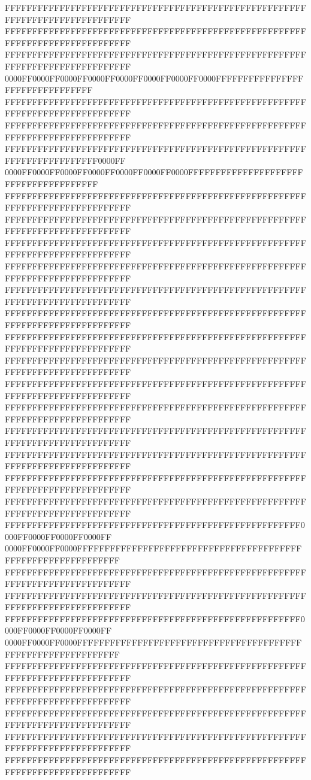 FFFFFFFFFFFFFFFFFFFFFFFFFFFFFFFFFFFFFFFFFFFFFFFFFFFFFFFFFFFFFFFFFFFFFFFFFFFFFF
FFFFFFFFFFFFFFFFFFFFFFFFFFFFFFFFFFFFFFFFFFFFFFFFFFFFFFFFFFFFFFFFFFFFFFFFFFFFFF
FFFFFFFFFFFFFFFFFFFFFFFFFFFFFFFFFFFFFFFFFFFFFFFFFFFFFFFFFFFFFFFFFFFFFFFFFFFFFF
0000FF0000FF0000FF0000FF0000FF0000FF0000FF0000FFFFFFFFFFFFFFFFFFFFFFFFFFFFFFFF
FFFFFFFFFFFFFFFFFFFFFFFFFFFFFFFFFFFFFFFFFFFFFFFFFFFFFFFFFFFFFFFFFFFFFFFFFFFFFF
FFFFFFFFFFFFFFFFFFFFFFFFFFFFFFFFFFFFFFFFFFFFFFFFFFFFFFFFFFFFFFFFFFFFFFFFFFFFFF
FFFFFFFFFFFFFFFFFFFFFFFFFFFFFFFFFFFFFFFFFFFFFFFFFFFFFFFFFFFFFFFFFFFFFFFF0000FF
0000FF0000FF0000FF0000FF0000FF0000FF0000FFFFFFFFFFFFFFFFFFFFFFFFFFFFFFFFFFFFFF
FFFFFFFFFFFFFFFFFFFFFFFFFFFFFFFFFFFFFFFFFFFFFFFFFFFFFFFFFFFFFFFFFFFFFFFFFFFFFF
FFFFFFFFFFFFFFFFFFFFFFFFFFFFFFFFFFFFFFFFFFFFFFFFFFFFFFFFFFFFFFFFFFFFFFFFFFFFFF
FFFFFFFFFFFFFFFFFFFFFFFFFFFFFFFFFFFFFFFFFFFFFFFFFFFFFFFFFFFFFFFFFFFFFFFFFFFFFF
FFFFFFFFFFFFFFFFFFFFFFFFFFFFFFFFFFFFFFFFFFFFFFFFFFFFFFFFFFFFFFFFFFFFFFFFFFFFFF
FFFFFFFFFFFFFFFFFFFFFFFFFFFFFFFFFFFFFFFFFFFFFFFFFFFFFFFFFFFFFFFFFFFFFFFFFFFFFF
FFFFFFFFFFFFFFFFFFFFFFFFFFFFFFFFFFFFFFFFFFFFFFFFFFFFFFFFFFFFFFFFFFFFFFFFFFFFFF
FFFFFFFFFFFFFFFFFFFFFFFFFFFFFFFFFFFFFFFFFFFFFFFFFFFFFFFFFFFFFFFFFFFFFFFFFFFFFF
FFFFFFFFFFFFFFFFFFFFFFFFFFFFFFFFFFFFFFFFFFFFFFFFFFFFFFFFFFFFFFFFFFFFFFFFFFFFFF
FFFFFFFFFFFFFFFFFFFFFFFFFFFFFFFFFFFFFFFFFFFFFFFFFFFFFFFFFFFFFFFFFFFFFFFFFFFFFF
FFFFFFFFFFFFFFFFFFFFFFFFFFFFFFFFFFFFFFFFFFFFFFFFFFFFFFFFFFFFFFFFFFFFFFFFFFFFFF
FFFFFFFFFFFFFFFFFFFFFFFFFFFFFFFFFFFFFFFFFFFFFFFFFFFFFFFFFFFFFFFFFFFFFFFFFFFFFF
FFFFFFFFFFFFFFFFFFFFFFFFFFFFFFFFFFFFFFFFFFFFFFFFFFFFFFFFFFFFFFFFFFFFFFFFFFFFFF
FFFFFFFFFFFFFFFFFFFFFFFFFFFFFFFFFFFFFFFFFFFFFFFFFFFFFFFFFFFFFFFFFFFFFFFFFFFFFF
FFFFFFFFFFFFFFFFFFFFFFFFFFFFFFFFFFFFFFFFFFFFFFFFFFFFFFFFFFFFFFFFFFFFFFFFFFFFFF
FFFFFFFFFFFFFFFFFFFFFFFFFFFFFFFFFFFFFFFFFFFFFFFFFFFFFF0000FF0000FF0000FF0000FF
0000FF0000FF0000FFFFFFFFFFFFFFFFFFFFFFFFFFFFFFFFFFFFFFFFFFFFFFFFFFFFFFFFFFFFFF
FFFFFFFFFFFFFFFFFFFFFFFFFFFFFFFFFFFFFFFFFFFFFFFFFFFFFFFFFFFFFFFFFFFFFFFFFFFFFF
FFFFFFFFFFFFFFFFFFFFFFFFFFFFFFFFFFFFFFFFFFFFFFFFFFFFFFFFFFFFFFFFFFFFFFFFFFFFFF
FFFFFFFFFFFFFFFFFFFFFFFFFFFFFFFFFFFFFFFFFFFFFFFFFFFFFF0000FF0000FF0000FF0000FF
0000FF0000FF0000FFFFFFFFFFFFFFFFFFFFFFFFFFFFFFFFFFFFFFFFFFFFFFFFFFFFFFFFFFFFFF
FFFFFFFFFFFFFFFFFFFFFFFFFFFFFFFFFFFFFFFFFFFFFFFFFFFFFFFFFFFFFFFFFFFFFFFFFFFFFF
FFFFFFFFFFFFFFFFFFFFFFFFFFFFFFFFFFFFFFFFFFFFFFFFFFFFFFFFFFFFFFFFFFFFFFFFFFFFFF
FFFFFFFFFFFFFFFFFFFFFFFFFFFFFFFFFFFFFFFFFFFFFFFFFFFFFFFFFFFFFFFFFFFFFFFFFFFFFF
FFFFFFFFFFFFFFFFFFFFFFFFFFFFFFFFFFFFFFFFFFFFFFFFFFFFFFFFFFFFFFFFFFFFFFFFFFFFFF
FFFFFFFFFFFFFFFFFFFFFFFFFFFFFFFFFFFFFFFFFFFFFFFFFFFFFFFFFFFFFFFFFFFFFFFFFFFFFF
